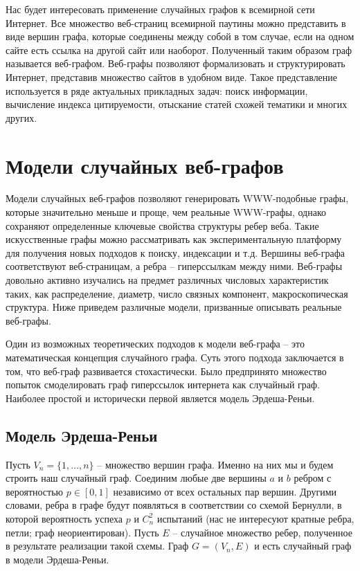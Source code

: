 \documentclass[14pt]{extreport}
\begin{document}
Нас будет интересовать применение случайных графов к всемирной сети Интернет. Все множество веб-страниц всемирной паутины можно представить в виде вершин графа, которые соединены между собой в том случае, если на одном сайте есть ссылка на другой сайт или наоборот. Полученный таким образом граф называется веб-графом. 
Веб-графы позволяют формализовать и структурировать Интернет, представив множество сайтов в удобном виде. Такое представление используется в ряде актуальных прикладных задач: поиск информации, вычисление индекса цитируемости, отыскание статей схожей тематики и многих других.

\chapter{Модели случайных веб-графов}

Модели случайных веб-графов позволяют генерировать WWW-подобные графы, которые значительно меньше и проще, чем реальные WWW-графы, однако сохраняют определенные ключевые свойства структуры ребер веба. Такие искусственные графы можно рассматривать как экспериментальную платформу для получения новых подходов к поиску, индексации и т.д.
Вершины веб-графа соответствуют веб-страницам, а ребра – гиперссылкам между ними. Веб-графы довольно активно изучались на предмет различных числовых характеристик таких, как распределение, диаметр, число связных компонент, макроскопическая структура. Ниже приведем различные модели, призванные описывать реальные веб-графы.

Один из возможных теоретических подходов к модели веб-графа -- это математическая концепция случайного графа. Суть этого подхода заключается в том, что веб-граф развивается стохастически.
Было предпринято множество попыток смоделировать граф гиперссылок интернета как случайный граф. Наиболее простой и исторически первой является модель Эрдеша-Реньи.

\section{Модель Эрдеша-Реньи}  

Пусть $V_n = \{1,\dots,n\}$ -- множество вершин графа. Именно на них мы и будем строить наш случайный граф. Соединим любые две вершины $a$ и $b$ ребром с вероятностью $p \in [0, 1]$ независимо от всех остальных пар вершин. Другими словами, ребра в графе будут появляться в соответствии со схемой Бернулли, в которой вероятность успеха $p$ и $C_n^2$ испытаний (нас не интересуют кратные ребра, петли; граф неориентирован). Пусть $E$ -- случайное множество ребер, полученное в результате реализации такой схемы. Граф $G = (V_n, E)$ и есть случайный граф в модели Эрдеша-Реньи.
\end{document}
